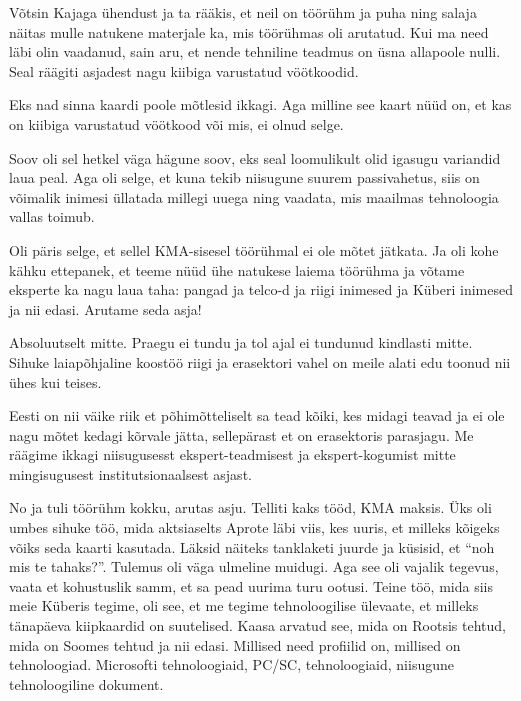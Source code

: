 Võtsin Kajaga ühendust ja ta  rääkis, et neil on töörühm ja puha ning salaja näitas mulle natukene  materjale ka, mis töörühmas oli arutatud. Kui ma  need  läbi olin vaadanud, sain aru, et nende tehniline teadmus on üsna  allapoole nulli. Seal räägiti asjadest nagu kiibiga varustatud vöötkoodid. 


Eks nad sinna kaardi poole mõtlesid ikkagi. Aga milline see kaart nüüd on, et  kas on kiibiga varustatud vöötkood või mis, ei olnud selge. 


Soov oli sel hetkel väga hägune soov, eks seal loomulikult olid igasugu variandid laua peal. Aga oli selge, et kuna tekib niisugune suurem passivahetus, siis on võimalik inimesi üllatada millegi uuega ning vaadata, mis maailmas tehnoloogia vallas toimub. 

Oli päris selge, et sellel KMA-sisesel töörühmal ei ole mõtet jätkata. Ja oli kohe kähku ettepanek, et teeme nüüd ühe natukese laiema töörühma ja võtame  eksperte ka nagu laua taha: pangad ja telco-d ja riigi inimesed ja Küberi inimesed ja nii edasi. Arutame seda asja!


Absoluutselt mitte. Praegu ei tundu ja tol ajal ei tundunud kindlasti mitte. Sihuke laiapõhjaline koostöö riigi ja erasektori vahel on meile alati edu toonud nii ühes kui teises. 


Eesti on nii väike riik et põhimõtteliselt sa tead kõiki, kes midagi teavad ja ei ole nagu mõtet kedagi kõrvale jätta, sellepärast et on erasektoris parasjagu. Me räägime ikkagi niisugusesst  ekspert-teadmisest ja ekspert-kogumist mitte mingisugusest institutsionaalsest asjast. 

No ja tuli töörühm kokku, arutas asju. Telliti kaks tööd, KMA maksis. Üks oli umbes sihuke töö, mida aktsiaselts Aprote läbi viis, kes uuris, et milleks kõigeks võiks seda kaarti kasutada. Läksid näiteks tanklaketi juurde ja küsisid, et \enquote{noh mis te tahaks?}. Tulemus oli väga ulmeline muidugi. Aga see oli vajalik tegevus,  vaata et kohustuslik samm, et sa pead uurima turu ootusi. Teine töö, mida siis meie Küberis tegime, oli see, et me tegime  tehnoloogilise ülevaate, et milleks tänapäeva kiipkaardid on suutelised. Kaasa arvatud see,  mida on Rootsis tehtud, mida on Soomes tehtud ja nii edasi.  Millised need profiilid on, millised on tehnoloogiad. Microsofti tehnoloogiaid, PC/SC, tehnoloogiaid, niisugune tehnoloogiline dokument. 

